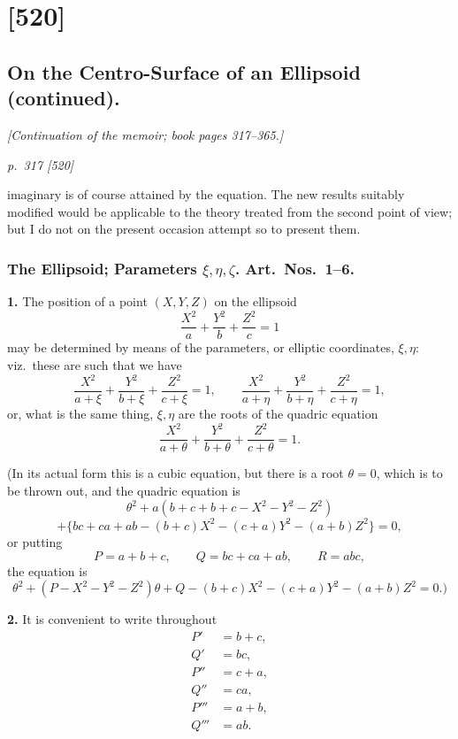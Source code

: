 \documentclass[11pt,a4paper]{article}
\theoremstyle{plain}
\theoremstyle{definition}
\begin{document}
\section{[520]}
\subsection{On the Centro-Surface of an Ellipsoid (continued).}

\begin{center}
\textit{[Continuation of the memoir; book pages 317--365.]}
\end{center}

\bigskip
\textit{p.~317 [520]}
\smallskip

\noindent
imaginary is of course attained by the equation. The new results suitably modified
would be applicable to the theory treated from the second point of view; but I do not
on the present occasion attempt so to present them.

\subsubsection*{The Ellipsoid; Parameters $\xi,\eta,\zeta$. Art.\ Nos.\ 1--6.}

\textbf{1.} The position of a point $(X, Y, Z)$ on the ellipsoid
\[
\frac{X^2}{a} + \frac{Y^2}{b} + \frac{Z^2}{c} = 1
\]
may be determined by means of the parameters, or elliptic coordinates, $\xi, \eta$: viz.\ these are such that we have
\[
\frac{X^2}{a + \xi} + \frac{Y^2}{b + \xi} + \frac{Z^2}{c + \xi} = 1,\qquad
\frac{X^2}{a + \eta} + \frac{Y^2}{b + \eta} + \frac{Z^2}{c + \eta} = 1,
\]
or, what is the same thing, $\xi, \eta$ are the roots of the quadric equation
\[
\frac{X^2}{a + \theta} + \frac{Y^2}{b + \theta} + \frac{Z^2}{c + \theta} = 1.
\]

(In its actual form this is a cubic equation, but there is a root $\theta = 0$, which is to be thrown out, and the quadric equation is
\[
\theta^2 + a(b + c + b + c - X^2 - Y^2 - Z^2)
\]
\[
+ \{bc + ca + ab - (b + c)X^2 - (c + a)Y^2 - (a + b)Z^2\} = 0,
\]
or putting
\[
P = a + b + c,\qquad Q = bc + ca + ab,\qquad R = abc,
\]
the equation is
\[
\theta^2 + (P - X^2 - Y^2 - Z^2)\theta + Q - (b + c)X^2 - (c + a)Y^2 - (a + b)Z^2 = 0.)
\]

\textbf{2.} It is convenient to write throughout
\begin{align*}
P' &= b + c,\\
Q' &= bc,\\
P'' &= c + a,\\
Q'' &= ca,\\
P''' &= a + b,\\
Q''' &= ab.
\end{align*}
\end{document}
